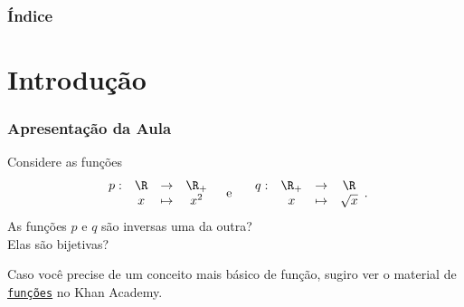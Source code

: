 \documentclass[10pt]{beamer}
\begin{document}
	


	{\backgroundimage\begin{frame}[plain]
		\titlepage
	\end{frame}}



	\begin{frame}
		\frametitle{Índice}
		\tableofcontents
	\end{frame}



\section{Introdução}

\begin{frame}  \frametitle{Apresentação da Aula}

Considere as funções
$$\begin{array}{cccc}
p : & \R & \to     & \R_+ \\
		 &  x & \mapsto & x^2
\end{array}
\text{\ \ \  e \ \ \ }
\begin{array}{cccc}
q : & \R_+ & \to     & \R \\
		 &  x & \mapsto & \sqrt x
\end{array}.$$
As funções $p$ e $q$ são inversas uma da outra? \\ \pause Elas são
bijetivas? \\ \pause

Caso você precise de um conceito mais básico de função, sugiro ver o
material de
\href{https://pt.khanacademy.org/math/algebra/algebra-functions}
{{\tt funções}} no Khan Academy.


\end{frame}

\end{document}
